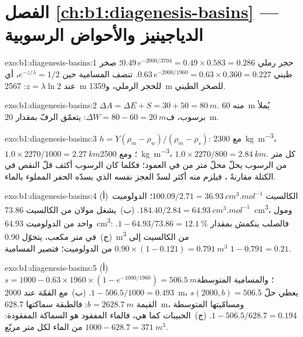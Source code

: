 \section*{الفصل \ref{ch:b1:diagenesis-basins} --- الدياجينيز والأحواض الرسوبية}

\begin{solution}{exo:b1:diagenesis-basins:1}
حجر رملي $0.49\,e^{-2000/3704} = 0.49\times0.583 = \num{0.286}$؛ صخر طيني $0.63\,e^{-2000/1960} = 0.63\times0.360 = \num{0.227}$. تنصف المسامية حين $e^{-z/\lambda} = 1/2$، أي عند $z = \lambda\ln 2$: \qty{2567}{m} للحجر الرملي، و\qty{1359}{m} للصخر الطيني.
\end{solution}

\begin{solution}{exo:b1:diagenesis-basins:2}
$\Delta A = \Delta E + S = 30 + 50 = \qty{80}{m}$. منه \qty{60}{m} يُملأ برسوب، ف$\Delta W = 80 - 60 = \qty{20}{m}$: يتعمّق الرفّ بمقدار \qty{20}{m}.
\end{solution}

\begin{solution}{exo:b1:diagenesis-basins:3}
$h = Y(\rho_m - \rho_w)/(\rho_m - \rho_s)$: مع \qty{2300}{kg.m^{-3}}، $1.0\times2270/1000 = \qty{2.27}{km}$؛ ومع \qty{2500}{kg.m^{-3}}، $1.0\times2270/800 = \qty{2.84}{km}$. كل متر من الرسوب يحلّ محلّ متر من  في العمود؛ فكلما كان الرسوب أكثف قلّ النقص في الكتلة مقارنةً ، فيلزم منه أكثر لسدّ العجز نفسه الذي يسدّه الحفر المملوء بالماء.
\end{solution}

\begin{solution}{exo:b1:diagenesis-basins:4}
(أ)~الكالسيت $100.09/2.71 = \qty{36.93}{cm^3.mol^{-1}}$؛ الدولوميت $184.40/2.84
= \qty{64.93}{cm^3.mol^{-1}}$. (ب)~يشغل مولان من الكالسيت \qty{73.86}{cm^3}، ومول واحد من الدولوميت \qty{64.93}{cm^3}: فالصلب ينكمش بمقدار $1 - 64.93/73.86 = \qty{12.1}{\%}$. (ج)~في متر مكعب، يتحوّل \qty{0.90}{m^3} من الكالسيت إلى $0.90\times(1 - 0.121) = \qty{0.791}{m^3}$ من الدولوميت؛ فتصير المسامية $1 - 0.791 = \num{0.21}$.
\end{solution}

\begin{solution}{exo:b1:diagenesis-basins:5}
(أ)~$s = 1000 - 0.63\times1960\times(1 - e^{-1000/1960}) = \qty{506.5}{m}$؛ والمسامية المتوسطة $1 - 506.5/1000 = \num{0.493}$. (ب)~مع القمّة عند \qty{2000}{m}، يعطي حلّ $s(2000, b) = 506.5$ القيمة $b = \qty{2628.7}{m}$: فالطبقة سماكتها \qty{628.7}{m}، ومسامّيتها المتوسطة $1 - 506.5/628.7 = \num{0.194}$. (ج)~الحبيبات كما هي، فالماء المفقود هو السماكة المفقودة: $1000 - 628.7 = \qty{371}{m^3}$ من الماء لكل متر مربّع.
\end{solution}

